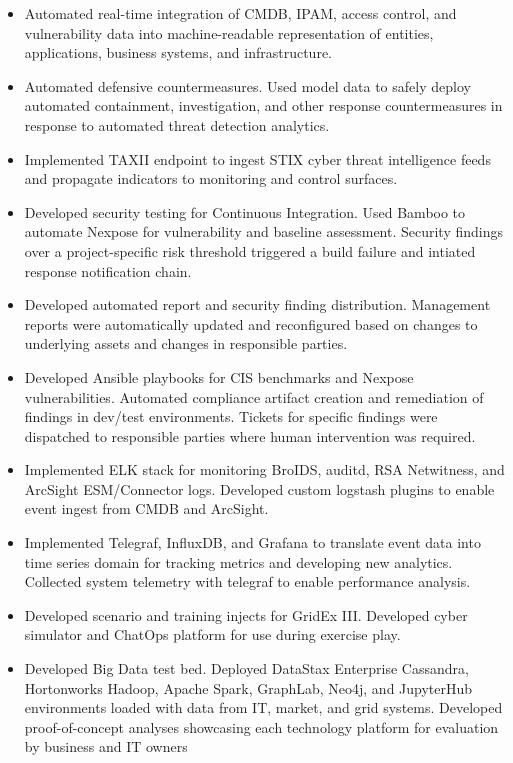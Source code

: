 \documentclass[10pt,]{article}
\providecommand{\tightlist}{%
  \setlength{\itemsep}{0pt}\setlength{\parskip}{0pt}}
\begin{document}
\begin{itemize}
\tightlist
\item
  Automated real-time integration of CMDB, IPAM, access control, and
  vulnerability data into machine-readable representation of entities,
  applications, business systems, and infrastructure.
\item
  Automated defensive countermeasures. Used model data to safely deploy
  automated containment, investigation, and other response
  countermeasures in response to automated threat detection analytics.
\item
  Implemented TAXII endpoint to ingest STIX cyber threat intelligence
  feeds and propagate indicators to monitoring and control surfaces.
\item
  Developed security testing for Continuous Integration. Used Bamboo to
  automate Nexpose for vulnerability and baseline assessment. Security
  findings over a project-specific risk threshold triggered a build
  failure and intiated response notification chain.
\item
  Developed automated report and security finding distribution.
  Management reports were automatically updated and reconfigured based
  on changes to underlying assets and changes in responsible parties.
\item
  Developed Ansible playbooks for CIS benchmarks and Nexpose
  vulnerabilities. Automated compliance artifact creation and
  remediation of findings in dev/test environments. Tickets for specific
  findings were dispatched to responsible parties where human
  intervention was required.
\item
  Implemented ELK stack for monitoring BroIDS, auditd, RSA Netwitness,
  and ArcSight ESM/Connector logs. Developed custom logstash plugins to
  enable event ingest from CMDB and ArcSight.
\item
  Implemented Telegraf, InfluxDB, and Grafana to translate event data
  into time series domain for tracking metrics and developing new
  analytics. Collected system telemetry with telegraf to enable
  performance analysis.
\item
  Developed scenario and training injects for GridEx III. Developed
  cyber simulator and ChatOps platform for use during exercise play.
\item
  Developed Big Data test bed. Deployed DataStax Enterprise Cassandra,
  Hortonworks Hadoop, Apache Spark, GraphLab, Neo4j, and JupyterHub
  environments loaded with data from IT, market, and grid systems.
  Developed proof-of-concept analyses showcasing each technology
  platform for evaluation by business and IT owners
\end{itemize}
\end{document}

